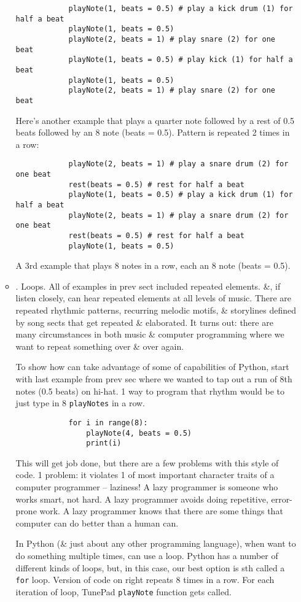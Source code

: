 \documentclass{article}
\begin{document}
\begin{itemize}
\begin{itemize}
		\begin{verbatim}
			playNote(1, beats = 0.5) # play a kick drum (1) for half a beat
			playNote(1, beats = 0.5)
			playNote(2, beats = 1) # play snare (2) for one beat
			playNote(1, beats = 0.5) # play kick (1) for half a beat
			playNote(1, beats = 0.5)
			playNote(2, beats = 1) # play snare (2) for one beat
		\end{verbatim}
		Here's another example that plays a quarter note followed by a rest of 0.5 beats followed by an 8 note (beats = 0.5). Pattern is repeated 2 times in a row:
		\begin{verbatim}
			playNote(2, beats = 1) # play a snare drum (2) for one beat
			rest(beats = 0.5) # rest for half a beat
			playNote(1, beats = 0.5) # play a kick drum (1) for half a beat
			playNote(2, beats = 1) # play a snare drum (2) for one beat
			rest(beats = 0.5) # rest for half a beat
			playNote(1, beats = 0.5)
		\end{verbatim}
		A 3rd example that plays 8 notes in a row, each an 8 note (beats = 0.5).
		\item {. Loops.} All of examples in prev sect included repeated elements. \&, if listen closely, can hear repeated elements at all levels of music. There are repeated rhythmic patterns, recurring melodic motifs, \& storylines defined by song sects that get repeated \& elaborated. It turns out: there are many circumstances in both music \& computer programming where we want to repeat something over \& over again.
		
		To show how can take advantage of some of capabilities of Python, start with last example from prev sec where we wanted to tap out a run of 8th notes (0.5 beats) on hi-hat. 1 way to program that rhythm would be to just type in 8 {\tt playNotes} in a row.
		\begin{verbatim}
			for i in range(8):
			    playNote(4, beats = 0.5)
			    print(i)
		\end{verbatim}
		This will get job done, but there are a few problems with this style of code. 1 problem: it violates 1 of most important character traits of a computer programmer -- laziness! A lazy programmer is someone who works smart, not hard. A lazy programmer avoids doing repetitive, error-prone work. A lazy programmer knows that there are some things that computer can do better than a human can.
		
		In Python (\& just about any other programming language), when want to do something multiple times, can use a loop. Python has a number of different kinds of loops, but, in this case, our best option is sth called a {\tt for} loop. Version of code on right repeats 8 times in a row. For each iteration of loop, TunePad {\tt playNote} function gets called.
		

\end{itemize}
\end{itemize}
\end{document}
